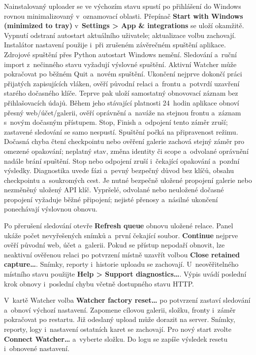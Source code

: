 \documentclass[11pt,a4paper]{article}
\newcommand{\ui}[1]{\textbf{#1}}
\begin{document}
Nainstalovaný uploader se ve výchozím stavu spustí po přihlášení do Windows
rovnou minimalizovaný v~oznamovací oblasti. Přepínač
\ui{Start with Windows (minimized to tray)} v~\ui{Settings > App \&
integrations}
se uloží okamžitě. Vypnutí odstraní autostart aktuálního uživatele; aktualizace
volbu zachovají. Instalátor nastavení použije i~při zrušeném závěrečném spuštění
aplikace. Zdrojové spuštění přes Python autostart Windows nemění. Sledování
a~ruční import z~nečinného stavu vyžadují výslovné spuštění.
Aktivní Watcher může pokračovat po běžném Quit a~novém spuštění. Ukončení
nejprve dokončí práci přijatých zapisujících vláken, ověří původní relaci
a~frontu a~potvrdí uzavření starého dočasného klíče. Teprve pak uloží samostatný
obnovovací záznam bez přihlašovacích údajů. Během jeho stávající platnosti
24~hodin aplikace obnoví přesný web/účet/galerii, ověří oprávnění a~naváže
na stejnou frontu a~záznam s~novým dočasným přístupem. Stop, Finish a~odpojení
tento záměr zruší; zastavené sledování se samo nespustí.
Spuštění počká na připravenost režimu. Dočasná chyba čtení checkpointu nebo
ověření galerie zachová stejný záměr pro omezené opakování; neplatný stav,
změna identity či scope a~odvolané oprávnění nadále brání spuštění. Stop nebo
odpojení zruší i~čekající opakování a~pozdní výsledky. Diagnostika uvede fázi
a~pevný bezpečný důvod bez klíčů, obsahu checkpointu a~soukromých cest.
Je nutné bezpečně uložené propojení galerie nebo nezměněný uložený API klíč.
Vypršelé, odvolané nebo neuložené dočasné propojení vyžaduje běžné připojení;
nejisté přenosy a~násilné ukončení ponechávají výslovnou obnovu.

Po přerušení sledování otevře \ui{Refresh queue} obnovu uložené relace.
Panel ukáže počet nevyřešených snímků a~první čekající soubor.
\ui{Continue} nejprve ověří původní web, účet a~galerii. Pokud se přístup
nepodaří obnovit, lze neaktivní ověřenou relaci po potvrzení místně uzavřít
volbou \ui{Close retained capture…}. Snímky, reporty i~historie uploadu
se zachovají. U~neověřitelného místního stavu použijte
\ui{Help > Support diagnostics…}. Výpis uvádí poslední krok obnovy
i~poslední chybu včetně dostupného stavu HTTP.

V~kartě Watcher volba \ui{Watcher factory reset…} po potvrzení zastaví
sledování a~obnoví výchozí nastavení. Zapomene cílovou galerii, složku,
fronty i~záměr pokračovat po restartu. Již odeslaný upload může dorazit
na server. Snímky, reporty, logy i~nastavení ostatních karet se zachovají.
Pro nový start zvolte \ui{Connect Watcher…} a~vyberte složku.
Do logu se zapíše výsledek resetu i~obnovené nastavení.
\end{document}
